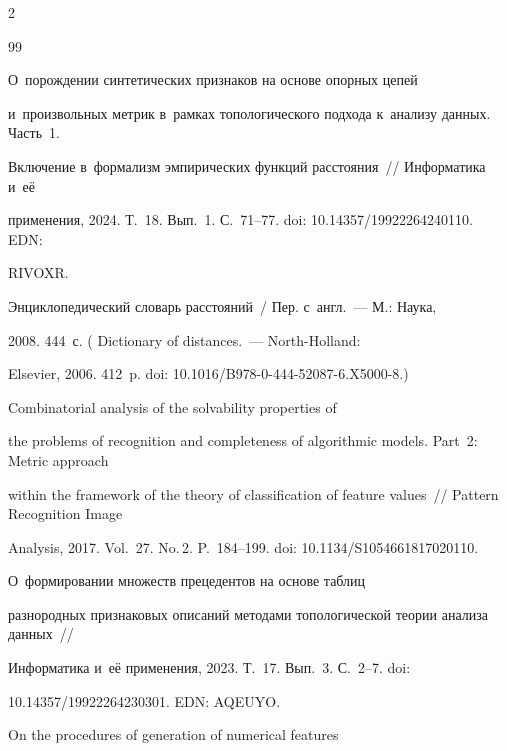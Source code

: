 \begin{multicols}{2}
{\small\frenchspacing

 {\baselineskip=10.6pt


 \begin{thebibliography}{99}

  


 О~порождении синтетических признаков на основе опорных цепей 

и~произвольных метрик в~рамках топологического подхода к~анализу данных. Часть~1. 

Включение в~формализм эмпирических функций расстояния~// Информатика и~её 

применения, 2024. Т.~18. Вып.~1. С.~71--77. doi: 10.14357/19922264240110. EDN: 

RIVOXR.


   Энциклопедический словарь расстояний~/ Пер. с~англ.~--- М.: Наука, 

2008. 444~с. ( {Dictionary of distances}.~--- North-Holland: 

Elsevier, 2006. 412~p. doi: 10.1016/B978-0-444-52087-6.X5000-8.)


   Combinatorial analysis of the solvability properties of 

the problems of recognition and completeness of algorithmic models. Part~2: Metric approach 

within the framework of the theory of classification of feature values~// Pattern Recognition Image 

Analysis, 2017. Vol.~27. No.\,2. P.~184--199. doi: 10.1134/S1054661817020110.


 О~формировании множеств прецедентов на основе таблиц 

разнородных признаковых описаний методами топологической теории анализа данных~// 

Информатика и~её применения, 2023. Т.~17. Вып.~3. С.~2--7. doi: 

10.14357/19922264230301. EDN: AQEUYO.


   On the procedures of generation of numerical features 


\end{thebibliography}}}
\end{multicols}
